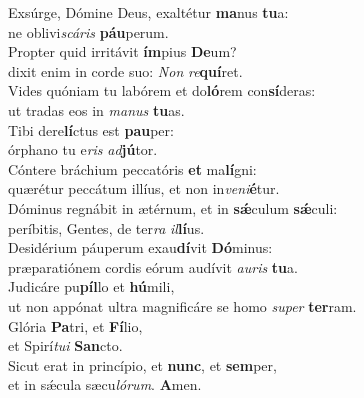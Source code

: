 \oddverse Exsúrge, Dómine Deus, exaltétur \textbf{ma}nus \textbf{tu}a:~\*\\
\oddverse ne oblivi\textit{scá}\textit{ris} \textbf{páu}perum.\\
\evenverse Propter quid irritávit \textbf{ím}pius \textbf{De}um?~\*\\
\evenverse dixit enim in corde suo: \textit{Non} \textit{re}\textbf{quí}ret.\\
\oddverse Vides quóniam tu labórem et do\textbf{ló}rem con\textbf{sí}deras:~\*\\
\oddverse ut tradas eos in \textit{ma}\textit{nus} \textbf{tu}as.\\
\evenverse Tibi dere\textbf{lí}ctus est \textbf{pau}per:~\*\\
\evenverse órphano tu e\textit{ris} \textit{ad}\textbf{jú}tor.\\
\oddverse Cóntere bráchium peccatóris \textbf{et} ma\textbf{lí}gni:~\*\\
\oddverse quærétur peccátum illíus, et non in\textit{ve}\textit{ni}\textbf{é}tur.\\
\evenverse Dóminus regnábit in ætérnum, et in \textbf{sǽ}culum \textbf{sǽ}culi:~\*\\
\evenverse períbitis, Gentes, de ter\textit{ra} \textit{il}\textbf{lí}us.\\
\oddverse Desidérium páuperum exau\textbf{dí}vit \textbf{Dó}minus:~\*\\
\oddverse præparatiónem cordis eórum audívit \textit{au}\textit{ris} \textbf{tu}a.\\
\evenverse Judicáre pu\textbf{píl}lo et \textbf{hú}mili,~\*\\
\evenverse ut non appónat ultra magnificáre se homo \textit{su}\textit{per} \textbf{ter}ram.\\
\oddverse Glória \textbf{Pa}tri, et \textbf{Fí}lio,~\*\\
\oddverse et Spirí\textit{tu}\textit{i} \textbf{San}cto.\\
\evenverse Sicut erat in princípio, et \textbf{nunc}, et \textbf{sem}per,~\*\\
\evenverse et in sǽcula sæcu\textit{ló}\textit{rum}. \textbf{A}men.\\
